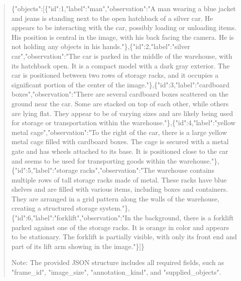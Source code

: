 \documentclass[10pt,a4paper]{article}
\begin{document}
\begin{quote}
\{"objects":\allowbreak{}[\{"id":\allowbreak{}1,\allowbreak{}"label":\allowbreak{}"man\allowbreak{}",\allowbreak{}"observation":\allowbreak{}"A man wearing a blue jacket and jeans is standing next to the open hatchback of a silver car. He appears to be interacting with the car,\allowbreak{} possibly loading or unloading items. His position is central in the image,\allowbreak{} with his back facing the camera. He is not holding any objects in his hands."\},\allowbreak{}\{"id":\allowbreak{}2,\allowbreak{}"label":\allowbreak{}"silver\allowbreak{} car",\allowbreak{}"observation":\allowbreak{}"The car is parked in the middle of the warehouse,\allowbreak{} with its hatchback open. It is a compact model with a dark gray exterior. The car is positioned between two rows of storage racks,\allowbreak{} and it occupies a significant portion of the center of the image."\},\allowbreak{}\{"id":\allowbreak{}3,\allowbreak{}"label":\allowbreak{}"cardbo\allowbreak{}ard boxes",\allowbreak{}"observation":\allowbreak{}"There are several cardboard boxes scattered on the ground near the car. Some are stacked on top of each other,\allowbreak{} while others are lying flat. They appear to be of varying sizes and are likely being used for storage or transportation within the warehouse."\},\allowbreak{}\{"id":\allowbreak{}4,\allowbreak{}"label":\allowbreak{}"ye\allowbreak{}llow metal cage",\allowbreak{}"observation":\allowbreak{}"To the right of the car,\allowbreak{} there is a large yellow metal cage filled with cardboard boxes. The cage is secured with a metal gate and has wheels attached to its base. It is positioned close to the car and seems to be used for transporting goods within the warehouse."\},\allowbreak{}\{"id":\allowbreak{}5,\allowbreak{}"label":\allowbreak{}"st\allowbreak{}orage racks",\allowbreak{}"observation":\allowbreak{}"The warehouse contains multiple rows of tall storage racks made of metal. These racks have blue shelves and are filled with various items,\allowbreak{} including boxes and containers. They are arranged in a grid pattern along the walls of the warehouse,\allowbreak{} creating a structured storage system."\},\allowbreak{}\{"id":\allowbreak{}6,\allowbreak{}"label":\allowbreak{}"forkl\allowbreak{}ift",\allowbreak{}"observation":\allowbreak{}"In the background,\allowbreak{} there is a forklift parked against one of the storage racks. It is orange in color and appears to be stationary. The forklift is partially visible,\allowbreak{} with only its front end and part of its lift arm showing in the image."\}]\}\par
\par
Note:\allowbreak{} The provided JSON structure includes all required fields,\allowbreak{} such as "frame\_id",\allowbreak{} "image\_size",\allowbreak{} "annotation\_kind",\allowbreak{} and "supplied\_objects".
\end{quote}
\end{document}
